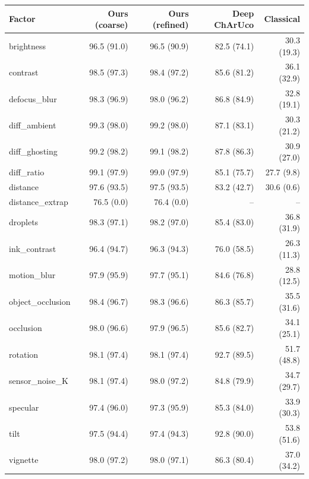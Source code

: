 \begin{tabular}{lrrrr}
\hline
Factor & Ours (coarse) & Ours (refined) & Deep ChArUco & Classical \\
\hline
brightness & 96.5 (91.0) & 96.5 (90.9) & 82.5 (74.1) & 30.3 (19.3) \\
contrast & 98.5 (97.3) & 98.4 (97.2) & 85.6 (81.2) & 36.1 (32.9) \\
defocus\_blur & 98.3 (96.9) & 98.0 (96.2) & 86.8 (84.9) & 32.8 (19.1) \\
diff\_ambient & 99.3 (98.0) & 99.2 (98.0) & 87.1 (83.1) & 30.3 (21.2) \\
diff\_ghosting & 99.2 (98.2) & 99.1 (98.2) & 87.8 (86.3) & 30.9 (27.0) \\
diff\_ratio & 99.1 (97.9) & 99.0 (97.9) & 85.1 (75.7) & 27.7 (9.8) \\
distance & 97.6 (93.5) & 97.5 (93.5) & 83.2 (42.7) & 30.6 (0.6) \\
distance\_extrap & 76.5 (0.0) & 76.4 (0.0) & -- & -- \\
droplets & 98.3 (97.1) & 98.2 (97.0) & 85.4 (83.0) & 36.8 (31.9) \\
ink\_contrast & 96.4 (94.7) & 96.3 (94.3) & 76.0 (58.5) & 26.3 (11.3) \\
motion\_blur & 97.9 (95.9) & 97.7 (95.1) & 84.6 (76.8) & 28.8 (12.5) \\
object\_occlusion & 98.4 (96.7) & 98.3 (96.6) & 86.3 (85.7) & 35.5 (31.6) \\
occlusion & 98.0 (96.6) & 97.9 (96.5) & 85.6 (82.7) & 34.1 (25.1) \\
rotation & 98.1 (97.4) & 98.1 (97.4) & 92.7 (89.5) & 51.7 (48.8) \\
sensor\_noise\_K & 98.1 (97.4) & 98.0 (97.2) & 84.8 (79.9) & 34.7 (29.7) \\
specular & 97.4 (96.0) & 97.3 (95.9) & 85.3 (84.0) & 33.9 (30.3) \\
tilt & 97.5 (94.4) & 97.4 (94.3) & 92.8 (90.0) & 53.8 (51.6) \\
vignette & 98.0 (97.2) & 98.0 (97.1) & 86.3 (80.4) & 37.0 (34.2) \\
\hline
\end{tabular}
